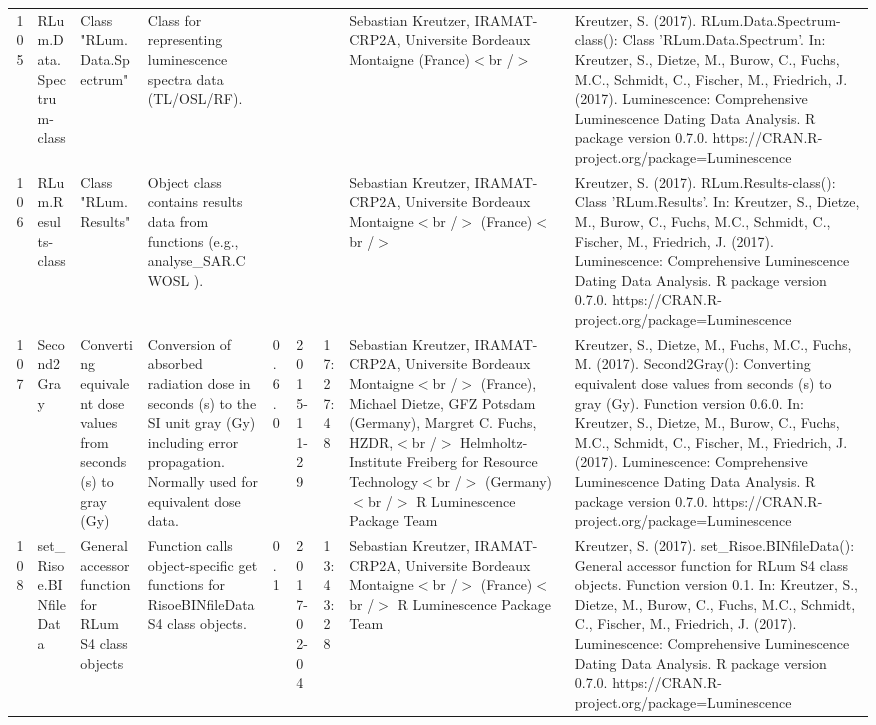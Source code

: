 \begin{table}[ht]
\begin{tabular}{rllllllll}
 \\ 
  105 & RLum.Data.Spectrum-class & Class  "RLum.Data.Spectrum" & Class for representing luminescence spectra data (TL/OSL/RF). &  &  &  & Sebastian Kreutzer, IRAMAT-CRP2A, Universite Bordeaux Montaigne (France)$<$br /$>$ & Kreutzer, S. (2017). RLum.Data.Spectrum-class(): Class 'RLum.Data.Spectrum'. In: Kreutzer, S., Dietze, M., Burow, C., Fuchs, M.C., Schmidt, C., Fischer, M., Friedrich, J. (2017). Luminescence: Comprehensive Luminescence Dating Data Analysis. R package version 0.7.0. https://CRAN.R-project.org/package=Luminescence
 \\ 
  106 & RLum.Results-class & Class  "RLum.Results" & Object class contains results data from functions (e.g.,  analyse\_SAR.CWOSL ). &  &  &  & Sebastian Kreutzer, IRAMAT-CRP2A, Universite Bordeaux Montaigne$<$br /$>$ (France)$<$br /$>$ & Kreutzer, S. (2017). RLum.Results-class(): Class 'RLum.Results'. In: Kreutzer, S., Dietze, M., Burow, C., Fuchs, M.C., Schmidt, C., Fischer, M., Friedrich, J. (2017). Luminescence: Comprehensive Luminescence Dating Data Analysis. R package version 0.7.0. https://CRAN.R-project.org/package=Luminescence
 \\ 
  107 & Second2Gray & Converting equivalent dose values from seconds (s) to gray (Gy) & Conversion of absorbed radiation dose in seconds (s) to the SI unit gray (Gy) including error propagation. Normally used for equivalent dose data. & 0.6.0 & 2015-11-29 & 17:27:48
 & Sebastian Kreutzer, IRAMAT-CRP2A, Universite Bordeaux Montaigne$<$br /$>$ (France),  Michael Dietze, GFZ Potsdam (Germany),  Margret C. Fuchs, HZDR,$<$br /$>$ Helmholtz-Institute Freiberg for Resource Technology$<$br /$>$ (Germany)$<$br /$>$  R Luminescence Package Team & Kreutzer, S., Dietze, M., Fuchs, M.C., Fuchs, M. (2017). Second2Gray(): Converting equivalent dose values from seconds (s) to gray (Gy). Function version 0.6.0. In: Kreutzer, S., Dietze, M., Burow, C., Fuchs, M.C., Schmidt, C., Fischer, M., Friedrich, J. (2017). Luminescence: Comprehensive Luminescence Dating Data Analysis. R package version 0.7.0. https://CRAN.R-project.org/package=Luminescence
 \\ 
  108 & set\_Risoe.BINfileData & General accessor function for RLum S4 class objects & Function calls object-specific get functions for RisoeBINfileData S4 class objects. & 0.1 & 2017-02-04 & 13:43:28
 & Sebastian Kreutzer, IRAMAT-CRP2A, Universite Bordeaux Montaigne$<$br /$>$ (France)$<$br /$>$  R Luminescence Package Team & Kreutzer, S. (2017). set\_Risoe.BINfileData(): General accessor function for RLum S4 class objects. Function version 0.1. In: Kreutzer, S., Dietze, M., Burow, C., Fuchs, M.C., Schmidt, C., Fischer, M., Friedrich, J. (2017). Luminescence: Comprehensive Luminescence Dating Data Analysis. R package version 0.7.0. https://CRAN.R-project.org/package=Luminescence

\end{tabular}
\end{table}
